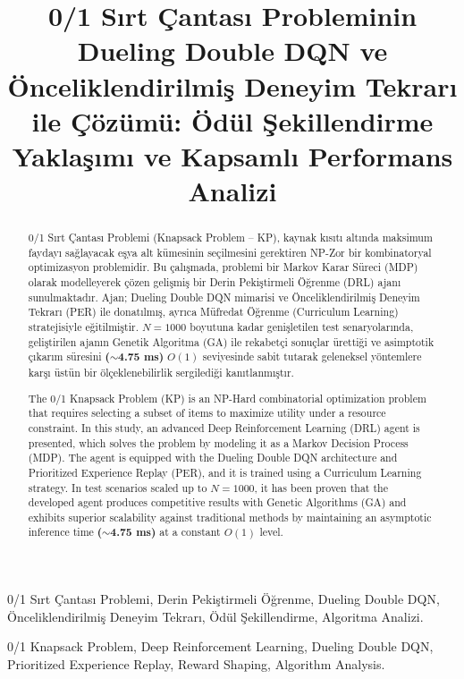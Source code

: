 \documentclass[conference]{IEEEtran}
\begin{document}
\title{0/1 Sırt Çantası Probleminin Dueling Double DQN ve Önceliklendirilmiş Deneyim Tekrarı ile Çözümü: Ödül Şekillendirme Yaklaşımı ve Kapsamlı Performans Analizi}

\author{
}

\maketitle

\begin{abstract}
0/1 Sırt Çantası Problemi (Knapsack Problem – KP), kaynak kısıtı altında maksimum faydayı sağlayacak eşya alt kümesinin seçilmesini gerektiren NP-Zor bir kombinatoryal optimizasyon problemidir. Bu çalışmada, problemi bir Markov Karar Süreci (MDP) olarak modelleyerek çözen gelişmiş bir Derin Pekiştirmeli Öğrenme (DRL) ajanı sunulmaktadır. Ajan; Dueling Double DQN mimarisi ve Önceliklendirilmiş Deneyim Tekrarı (PER) ile donatılmış, ayrıca Müfredat Öğrenme (Curriculum Learning) stratejisiyle eğitilmiştir. $N=1000$ boyutuna kadar genişletilen test senaryolarında, geliştirilen ajanın Genetik Algoritma (GA) ile rekabetçi sonuçlar ürettiği ve asimptotik çıkarım süresini \textbf{($\sim$4.75 ms)} $O(1)$ seviyesinde sabit tutarak geleneksel yöntemlere karşı üstün bir ölçeklenebilirlik sergilediği kanıtlanmıştır.
\end{abstract}
\medskip
\begin{IEEEkeywords}
0/1 Sırt Çantası Problemi, Derin Pekiştirmeli Öğrenme, Dueling Double DQN, Önceliklendirilmiş Deneyim Tekrarı, Ödül Şekillendirme, Algoritma Analizi.
\end{IEEEkeywords}

\medskip
\begin{abstract}
The 0/1 Knapsack Problem (KP) is an NP-Hard combinatorial optimization problem that requires selecting a subset of items to maximize utility under a resource constraint. In this study, an advanced Deep Reinforcement Learning (DRL) agent is presented, which solves the problem by modeling it as a Markov Decision Process (MDP). The agent is equipped with the Dueling Double DQN architecture and Prioritized Experience Replay (PER), and it is trained using a Curriculum Learning strategy. In test scenarios scaled up to $N=1000$, it has been proven that the developed agent produces competitive results with Genetic Algorithms (GA) and exhibits superior scalability against traditional methods by maintaining an asymptotic inference time \textbf{($\sim$4.75 ms)} at a constant $O(1)$ level.
\end{abstract}
\medskip
\begin{IEEEkeywords}
0/1 Knapsack Problem, Deep Reinforcement Learning, Dueling Double DQN, Prioritized Experience Replay, Reward Shaping, Algorithm Analysis.
\end{IEEEkeywords}
\end{document}
